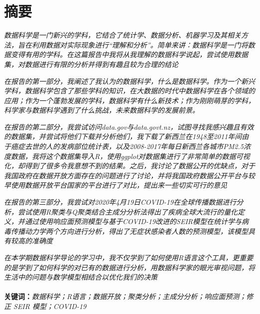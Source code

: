 \documentclass[a4paper, 11pt,twoside=true,UTF8]{scrartcl}
\author{
	刘锴睿\\
}
\begin{document}
\renewcommand{\contentsname}{目录}
\renewcommand\refname{参考文献}

\maketitle

\newpage
\section*{摘要}
\qquad \textit{数据科学是一门新兴的学科，它结合了统计学、数据分析、机器学习及其相关方法，旨在利用数据对实际现象进行“理解和分析”。简单来讲：数据科学是一门将数据变得有用的学科。在这篇报告中我将从我理解的数据科学说起，尝试使用数据集，对数据进行有限的分析并得到有趣且较为合理的结论}

\textit{在报告的第一部分，我阐述了我认为的数据科学，什么是数据科学。作为一个新兴学科，数据科学包含了那些学科的知识，在大数据的时代中数据科学在各个领域的应用；作为一个蓬勃发展的学科，数据科学有什么新技术；作为刚刚萌芽的学科，科学家与数据科学遇到了什么挑战，未来数据科学的发展前景。}

\textit{在报告的第二部分，我尝试访问data.gov与data.govt.nz，试图寻找我感兴趣且有效的数据集，并尝试将他们下载并分析他们，我下载了新西兰在1948至2011年间由于癌症去世的人的发病部位统计表，以及2008-2017年每日新西兰各城市PM2.5浓度数据，我将这个数据集导入R，使用ggplot对数据集进行了非常简单的数据可视化，却得到了很多令我意想不到的结果。之后，我讨论了数据公开的优缺点，对于我国政府在数据开放方面存在的问题进行了讨论，并将我国政府数据公开平台与较早使用数据开放平台国家的平台进行了对比，提出来一些切实可行的意见}

\textit{在报告的第三部分，我尝试对2020年4月19日COVID-19在全球传播数据进行分析，尝试使用R聚类与Q聚类结合主成分分析法得出了疾病全球大流行的量化定义，并通过使用响应面预测模型与基于COVID-19改进的SEIR模型在统计学与病毒传播动力学两个方向进行分析，得出了无症状感染者人数的预测模型，该模型具有较高的准确度}

\textit{在本学期数据科学导论的学习中，我不仅学到了如何使用R语言这个工具，更重要的是学到了如何科学的对已有的数据进行分析，用数据科学家的眼光审视问题，将生活中的问题与数学模型相结合以优化我们的决策}
\\ \\
\textbf{关键词：}\textit{数据科学；R语言；数据开放；聚类分析；主成分分析；响应面预测；修正 SEIR 模型；COVID-19}
\end{document}
